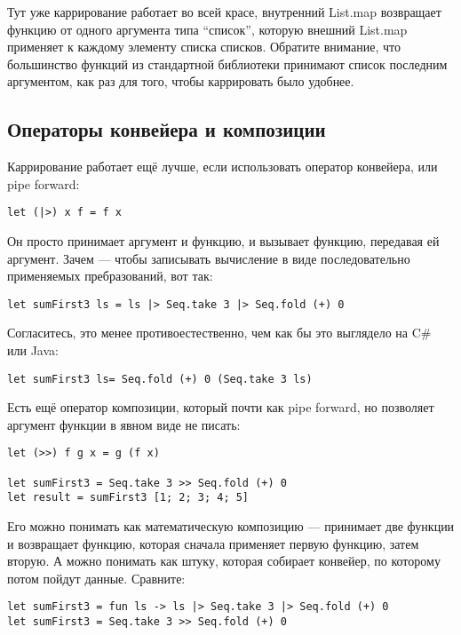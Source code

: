 \documentclass[a5paper]{article}
\begin{document}
Тут уже каррирование работает во всей красе, внутренний List.map возвращает функцию от одного аргумента типа ``список'', которую внешний List.map применяет к каждому элементу списка списков. Обратите внимание, что большинство функций из стандартной библиотеки принимают список последним аргументом, как раз для того, чтобы каррировать было удобнее.

\subsection{Операторы конвейера и композиции}

Каррирование работает ещё лучше, если использовать оператор конвейера, или pipe forward:

\begin{verbatim}
let (|>) x f = f x
\end{verbatim}

Он просто принимает аргумент и функцию, и вызывает функцию, передавая ей аргумент. Зачем --- чтобы записывать вычисление в виде последовательно применяемых пребразований, вот так:

\begin{verbatim}
let sumFirst3 ls = ls |> Seq.take 3 |> Seq.fold (+) 0
\end{verbatim}

Согласитесь, это менее противоестественно, чем как бы это выглядело на C\# или Java:

\begin{verbatim}
let sumFirst3 ls= Seq.fold (+) 0 (Seq.take 3 ls)
\end{verbatim}

Есть ещё оператор композиции, который почти как pipe forward, но позволяет аргумент функции в явном виде не писать:

\begin{verbatim}
let (>>) f g x = g (f x)

let sumFirst3 = Seq.take 3 >> Seq.fold (+) 0
let result = sumFirst3 [1; 2; 3; 4; 5]
\end{verbatim}

Его можно понимать как математическую композицию --- принимает две функции и возвращает функцию, которая сначала применяет первую функцию, затем вторую. А можно понимать как штуку, которая собирает конвейер, по которому потом пойдут данные. Сравните: 

\begin{verbatim}
let sumFirst3 = fun ls -> ls |> Seq.take 3 |> Seq.fold (+) 0
let sumFirst3 = Seq.take 3 >> Seq.fold (+) 0
\end{verbatim}
\end{document}
